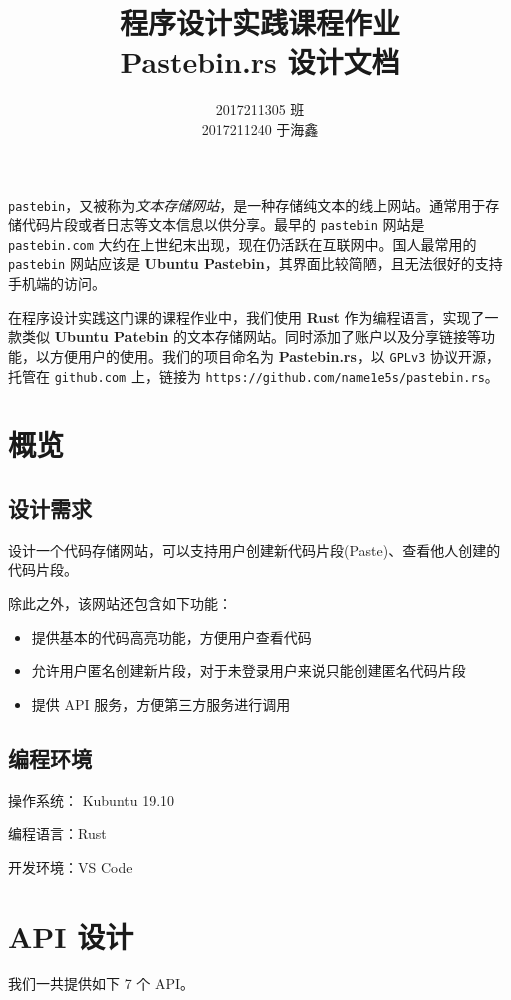 \documentclass[ichigo,normal,cn]{elegantnote}
\title{程序设计实践课程作业 \\ 
Pastebin.rs 设计文档}
\author{2017211305 班 \\ 2017211240 于海鑫}
\newcommand{\code}[1]{\colorbox{light-gray}{\texttt{#1}}}
\begin{document}
\maketitle

\code{pastebin}，又被称为\emph{文本存储网站}，是一种存储纯文本的线上网站。通常用于存储代码片段或者日志等文本信息以供分享。最早的 \code{pastebin} 网站是 \code{pastebin.com} 大约在上世纪末出现，现在仍活跃在互联网中。国人最常用的 \code{pastebin} 网站应该是 \textbf{Ubuntu Pastebin}，其界面比较简陋，且无法很好的支持手机端的访问。

在程序设计实践这门课的课程作业中，我们使用 \textbf{Rust} 作为编程语言，实现了一款类似 \textbf{Ubuntu Patebin} 的文本存储网站。同时添加了账户以及分享链接等功能，以方便用户的使用。我们的项目命名为 \textbf{Pastebin.rs}，以 \texttt{GPLv3} 协议开源，托管在 \code{github.com} 上，链接为 \texttt{https://github.com/name1e5s/pastebin.rs}。

\section{概览}

\subsection{设计需求}
设计一个代码存储网站，可以支持用户创建新代码片段(Paste)、查看他人创建的代码片段。

除此之外，该网站还包含如下功能：
\begin{itemize}
    \item 提供基本的代码高亮功能，方便用户查看代码
    \item 允许用户匿名创建新片段，对于未登录用户来说只能创建匿名代码片段
    \item 提供 API 服务，方便第三方服务进行调用
\end{itemize}

\subsection{编程环境}

操作系统： Kubuntu 19.10

编程语言：Rust

开发环境：VS Code

\section{API 设计}

我们一共提供如下 7 个 API。
\end{document}
